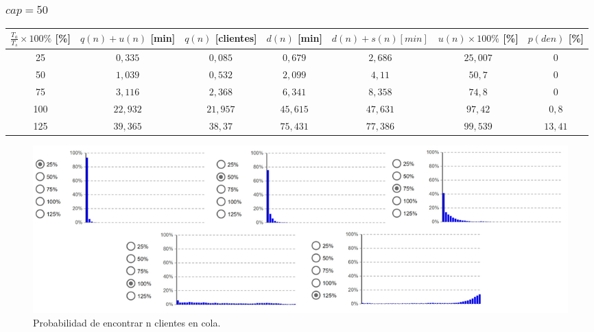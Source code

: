 \subsubsection[cap = 50]{$cap = 50$}

\begin{tabular}{||c||c|c|c|c|c|c||}
    \hline \hline
    $\frac{T_a}{T_s}\times100\%$ [\%] & $q(n)+u(n)$ [min] & $q(n)$ [clientes] & $d(n)$ [min] & $d(n)+s(n) [min]$ & $u(n)\times100\%$ [\%] & $p(den)$ [\%] \\
    \hline \hline
    25 & $0,335$ & $0,085$ & $0,679$ & $2,686$ & $25,007$ & $0$ \\
    \hline
    50 & $1,039$ & $0,532$ & $2,099$ & $4,11$ & $50,7$ & $0$ \\
    \hline
    75 & $3,116$ & $2,368$ & $6,341$ & $8,358$ & $74,8$ & $0$ \\
    \hline
    100 & $22,932$ & $21,957$ & $45,615$ & $47,631$ & $97,42$ & $0,8$ \\
    \hline
    125 & $39,365$ & $38,37$ & $75,431$ & $77,386$ & $99,539$ & $13,41$ \\
    \hline \hline
\end{tabular}

\begin{figure}[H]
  \includegraphics[width=\linewidth]{images/anylogic-colas-50}
  \caption{Probabilidad de encontrar n clientes en cola.}
\end{figure}
